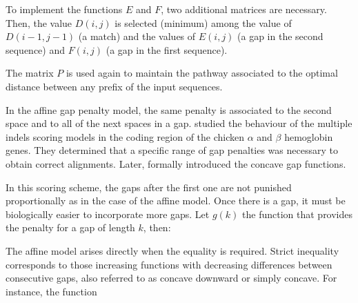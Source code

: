 
To implement the functions $E$ and $F$, two additional matrices are necessary. Then, the value $D(i,j)$
is selected (minimum) among the value of $D(i-1,j-1)$ (a match) and the values of $E(i,j)$ (a gap
in the second sequence) and $F(i,j)$ (a gap in the first sequence).

The matrix $P$ is used again to maintain the pathway associated to the optimal distance between any 
prefix of the input sequences.

\label{sec:concave}

In the affine gap penalty model, the same penalty is associated to the second space and to all of the 
next spaces in a gap. \citet{fitch:1983a} studied the behaviour of the multiple indels scoring models
in the coding region of the chicken $\alpha$ and $\beta$ hemoglobin genes. They determined that a specific
range of gap penalties was necessary to obtain correct alignments. Later, \citet{waterman:1984b} formally
introduced the concave gap functions.

In this scoring scheme, the gaps after the first one are not punished proportionally as in the case of
the affine model. Once there is a gap, it must be biologically easier to incorporate more gaps. Let 
$g(k)$ the function that provides the penalty for a gap of length $k$, then:

\begin{center}
\end{center}

The affine model arises directly when the equality is required. Strict inequality corresponds to those
increasing functions with decreasing differences between consecutive gaps, also referred to as concave 
downward or simply concave. For instance, the function

\begin{center}
\end{center}

